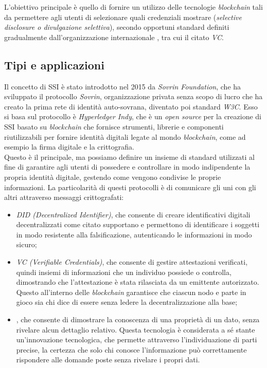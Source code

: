 L'obiettivo principale è quello di fornire un utilizzo delle tecnologie \textit{blockchain} tali da permettere agli utenti 
di selezionare quali credenziali mostrare (\textit{selective disclosure o divulgazione selettiva}),
secondo opportuni standard definiti gradualmente dall'organizzazione internazionale , tra cui il citato \textit{VC}.\@

\subsection{Tipi e applicazioni}\label{sec:self-sovereign-identity-tipi-applicazioni}

Il concetto di SSI è stato introdotto nel 2015 da \textit{Sovrin Foundation}, che ha sviluppato il protocollo \textit{Sovrin},
organizzazione privata senza scopo di lucro che ha creato la prima rete di identità auto-sovrana, diventato poi standard \textit{W3C}. 
Esso si basa sul protocollo è \textit{Hyperledger Indy}, che è un  \textit{open source }per la creazione di SSI basato su \textit{blockchain}
che fornisce strumenti, librerie e componenti riutilizzabili per fornire identità digitali legate al mondo \textit{blockchain}, 
come ad esempio la firma digitale e la crittografia. \\

Questo è il principale, ma possiamo definire un insieme di standard 
utilizzati al fine di garantire agli utenti di possedere e controllare in modo indipendente la propria identità digitale, gestendo come vengono
condivise le proprie informazioni. La particolarità di questi protocolli è di comunicare gli uni con gli altri attraverso messaggi crittografati:
\begin{itemize}
    \item \textit{DID (Decentralized Identifier)}, che consente di creare identificativi digitali decentralizzati come citato supportano
    e permettono di identificare i soggetti in modo resistente alla falsificazione, autenticando le informazioni in modo sicuro;
    \item \textit{VC (Verifiable Credentials)}, che consente di gestire attestazioni verificati, quindi insiemi di informazioni che un individuo
    possiede o controlla, dimostrando che l'attestazione è stata rilasciata da un emittente autorizzato. Questo all'interno delle \textit{blockchain}
    garantisce che ciascun nodo e parte in gioco sia chi dice di essere senza ledere la decentralizzazione alla base;
    \item {}, che consente di dimostrare la conoscenza di una proprietà di un dato, senza rivelare alcun dettaglio relativo.
    Questa tecnologia è considerata a sé stante un'innovazione tecnologica, che permette attraverso l'individuazione di parti precise,
    la certezza che solo chi conosce l'informazione può correttamente rispondere alle domande poste senza rivelare i propri dati.
\end{itemize}

